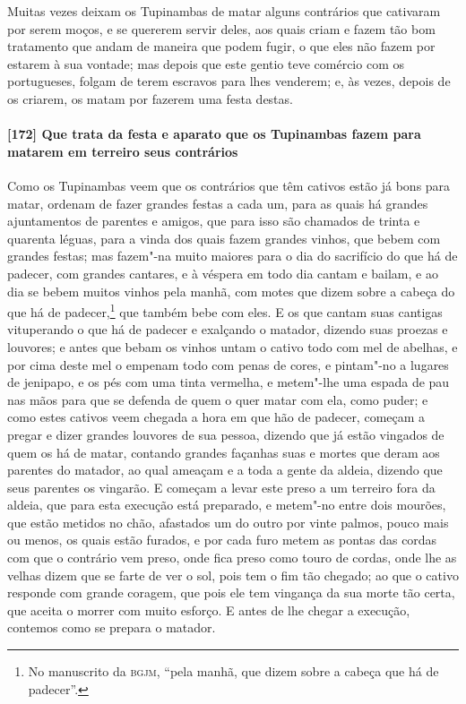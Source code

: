 \begin{linenumbers}
Muitas vezes deixam os Tupinambas de matar alguns contrários que cativaram por serem
moços, e se quererem servir deles, aos quais criam e fazem tão bom tratamento que andam de
maneira que podem fugir, o que eles não fazem por estarem à sua vontade; mas depois que
este gentio teve comércio com os portugueses, folgam de terem escravos para lhes venderem;
e, às vezes, depois de os criarem, os matam por fazerem uma festa destas.

\paragraph{[172] Que trata da festa e aparato que os Tupinambas fazem para matarem em
terreiro seus contrários}\quad
Como os Tupinambas veem que os contrários que têm cativos estão já bons para matar,
ordenam de fazer grandes festas a cada um, para as quais há grandes ajuntamentos de
parentes e amigos, que para isso são chamados de trinta e quarenta léguas, para a vinda
dos quais fazem grandes vinhos, que bebem com grandes festas; mas fazem"-na muito maiores
para o dia do sacrifício do que há de padecer, com grandes cantares, e à véspera em todo
dia cantam e bailam, e ao dia se bebem muitos vinhos pela manhã, com motes que dizem sobre
a cabeça do que há de padecer,\footnote{ No manuscrito da \textsc{bgjm}, ``pela manhã, que
dizem sobre a cabeça que há de padecer''.} que também bebe com eles. E os que cantam suas
cantigas vituperando o que há de padecer e exalçando o matador, dizendo suas proezas e
louvores; e antes que bebam os vinhos untam o cativo todo com mel de abelhas, e por cima
deste mel o empenam todo com penas de cores, e pintam"-no a lugares de jenipapo, e os pés
com uma tinta vermelha, e metem"-lhe uma espada de pau nas mãos para que se defenda de quem
o quer matar com ela, como puder; e como estes cativos veem chegada a hora em que hão de
padecer, começam a pregar e dizer grandes louvores de sua pessoa, dizendo que já estão
vingados de quem os há de matar, contando grandes façanhas suas e mortes que deram aos
parentes do matador, ao qual ameaçam e a toda a gente da aldeia, dizendo que seus parentes
os vingarão. E começam a levar este preso a um terreiro fora da aldeia, que para esta
execução está preparado, e metem"-no entre dois mourões, que estão metidos no chão,
afastados um do outro por vinte palmos, pouco mais ou menos, os quais estão furados, e por
cada furo metem as pontas das cordas com que o contrário vem preso, onde fica preso como
touro de cordas, onde lhe as velhas dizem que se farte de ver o sol, pois tem o fim tão
chegado; ao que o cativo responde com grande coragem, que pois ele tem vingança da sua
morte tão certa, que aceita o morrer com muito esforço. E antes de lhe chegar a execução,
contemos como se prepara o matador.


\end{linenumbers}
